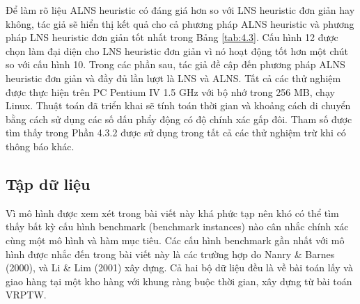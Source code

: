 Để làm rõ liệu ALNS heuristic có đáng giá hơn so với LNS heuristic đơn giản hay không, tác giả sẽ hiển thị kết quả cho cả phương pháp ALNS heuristic và phương pháp LNS heuristic đơn giản tốt nhất trong Bảng \ref{tab:4.3}. Cấu hình 12 được chọn làm đại diện cho LNS heuristic đơn giản vì nó hoạt động tốt hơn một chút so với cấu hình 10. Trong các phần sau, tác giả đề cập đến phương pháp ALNS heuristic đơn giản và đầy đủ lần lượt là LNS và ALNS.
Tất cả các thử nghiệm được thực hiện trên PC Pentium IV 1.5 GHz với bộ nhớ trong 256 MB, chạy Linux. Thuật toán đã triển khai sẽ tính toán thời gian và khoảng cách di chuyển bằng cách sử dụng các số dấu phẩy động có độ chính xác gấp đôi. Tham số được tìm thấy trong Phần 4.3.2 được sử dụng trong tất cả các thử nghiệm trừ khi có thông báo khác.

\subsection{Tập dữ liệu}
Vì mô hình được xem xét trong bài viết này khá phức tạp nên khó có thể tìm thấy bất kỳ cấu hình benchmark (benchmark instances) nào cân nhắc chính xác cùng một mô hình và hàm mục tiêu. Các cấu hình benchmark gần nhất với mô hình được nhắc đến trong bài viết này là các trường hợp do Nanry \& Barnes (2000), và Li \& Lim (2001) xây dựng. Cả hai bộ dữ liệu đều là về bài toán lấy và giao hàng tại một kho hàng với khung ràng buộc thời gian, xây dựng từ bài toán VRPTW.


